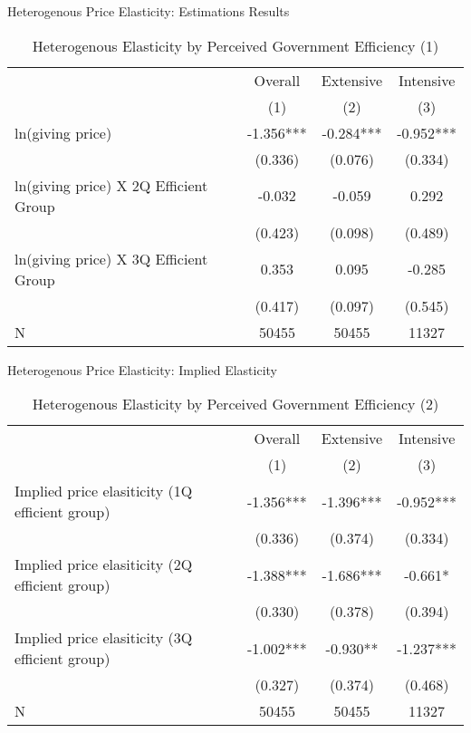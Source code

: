 \documentclass[
  ignorenonframetext,
]{beamer}
\begin{document}
\begin{frame}{Heterogenous Price Elasticity: Estimations Results}
\protect\hypertarget{heterogenous-price-elasticity-estimations-results}{}
\begin{table}

\caption{\label{tab:kableHeteroElasticitySlide1}Heterogenous Elasticity by Perceived Government Efficiency (1)}
\centering
\fontsize{8}{10}\selectfont
\begin{tabular}[t]{lccc}
\toprule
\multicolumn{1}{c}{ } & \multicolumn{1}{c}{Overall} & \multicolumn{1}{c}{Extensive} & \multicolumn{1}{c}{Intensive} \\
\cmidrule(l{3pt}r{3pt}){2-2} \cmidrule(l{3pt}r{3pt}){3-3} \cmidrule(l{3pt}r{3pt}){4-4}
 & (1) & (2) & (3)\\
\midrule
ln(giving price) & -1.356*** & -0.284*** & -0.952***\\
 & (0.336) & (0.076) & (0.334)\\
ln(giving price) X 2Q Efficient Group & -0.032 & -0.059 & 0.292\\
 & (0.423) & (0.098) & (0.489)\\
ln(giving price) X 3Q Efficient Group & 0.353 & 0.095 & -0.285\\
 & (0.417) & (0.097) & (0.545)\\
N & 50455 & 50455 & 11327\\
\bottomrule
\end{tabular}
\end{table}
\end{frame}

\begin{frame}{Heterogenous Price Elasticity: Implied Elasticity}
\protect\hypertarget{heterogenous-price-elasticity-implied-elasticity}{}
\begin{table}

\caption{\label{tab:kableHeteroElasticitySlide2}Heterogenous Elasticity by Perceived Government Efficiency (2)}
\centering
\fontsize{8}{10}\selectfont
\begin{tabular}[t]{lccc}
\toprule
\multicolumn{1}{c}{ } & \multicolumn{1}{c}{Overall} & \multicolumn{1}{c}{Extensive} & \multicolumn{1}{c}{Intensive} \\
\cmidrule(l{3pt}r{3pt}){2-2} \cmidrule(l{3pt}r{3pt}){3-3} \cmidrule(l{3pt}r{3pt}){4-4}
 & (1) & (2) & (3)\\
\midrule
Implied price elasiticity (1Q efficient group) & -1.356*** & -1.396*** & -0.952***\\
 & (0.336) & (0.374) & (0.334)\\
Implied price elasiticity (2Q efficient group) & -1.388*** & -1.686*** & -0.661*\\
 & (0.330) & (0.378) & (0.394)\\
Implied price elasiticity (3Q efficient group) & -1.002*** & -0.930** & -1.237***\\
 & (0.327) & (0.374) & (0.468)\\
N & 50455 & 50455 & 11327\\
\bottomrule
\end{tabular}
\end{table}
\end{frame}
\end{document}
